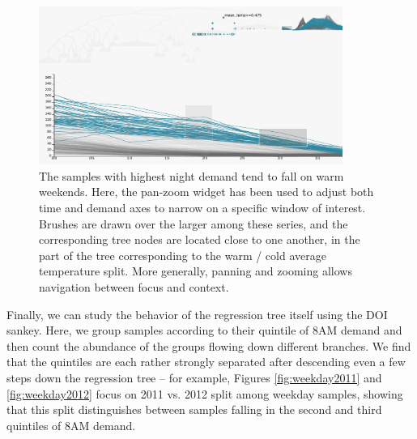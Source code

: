 \documentclass[12pt]{article}
\begin{document}
\begin{figure}

{\centering \includegraphics[width=375px]{figure/warm_weekend}

}

\caption{The samples with highest night demand tend to fall on warm
  weekends. Here, the pan-zoom widget has been used to adjust both time and
  demand axes to narrow on a specific window of interest. Brushes are drawn over
  the larger among these series, and the corresponding tree nodes are located
  close to one another, in the part of the tree corresponding to the warm / cold
  average temperature split. More generally, panning and zooming allows
  navigation between focus and context.}\label{fig:warmweekend}
\end{figure}

Finally, we can study the behavior of the regression tree itself using
the DOI sankey. Here, we group samples according to their quintile of
8AM demand and then count the abundance of the groups flowing down
different branches. We find that the quintiles are each rather strongly
separated after descending even a few steps down the regression tree --
for example, Figures \ref{fig:weekday2011} and \ref{fig:weekday2012}
focus on 2011 vs. 2012 split among weekday samples, showing that this
split distinguishes between samples falling in the second and third
quintiles of 8AM demand.
\end{document}
